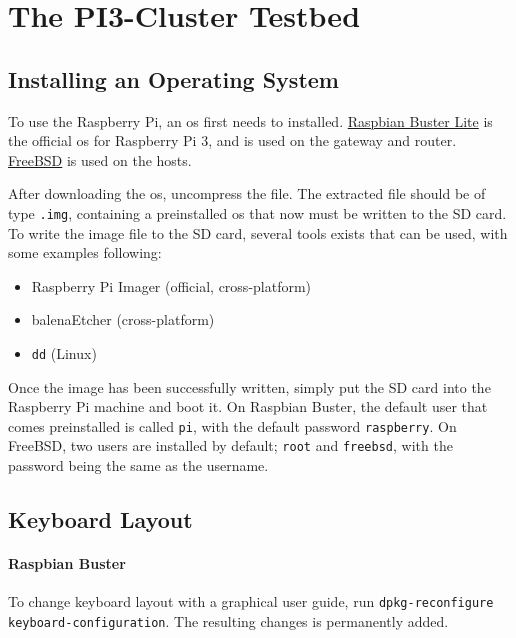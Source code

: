 \chapter{The PI3-Cluster Testbed}

\section{Installing an Operating System} \label{install_os}

To use the Raspberry Pi, an \gls{os} first needs to installed. \href{https://www.raspberrypi.org/downloads/raspbian/}{Raspbian Buster Lite} is the official \gls{os} for Raspberry Pi 3, and is used on the gateway and router. \href{https://www.freebsd.org/}{FreeBSD} is used on the hosts.

After downloading the \gls{os}, uncompress the file. The extracted file should be of type \lstinline{.img}, containing a preinstalled \gls{os} that now must be written to the SD card. To write the image file to the SD card, several tools exists that can be used, with some examples following:

\begin{itemize}
    \item Raspberry Pi Imager (official, cross-platform)
    \item balenaEtcher (cross-platform)
    \item \lstinline{dd} (Linux)
\end{itemize}

Once the image has been successfully written, simply put the SD card into the Raspberry Pi machine and boot it. On Raspbian Buster, the default user that comes preinstalled is called \lstinline{pi}, with the default password \lstinline{raspberry}. On FreeBSD, two users are installed by default; \lstinline{root} and \lstinline{freebsd}, with the password being the same as the username.


\section{Keyboard Layout} \label{keyboard_layout}

\subsubsection{Raspbian Buster}

To change keyboard layout with a graphical user guide, run \lstinline{dpkg-reconfigure keyboard-configuration}. The resulting changes is permanently added.

